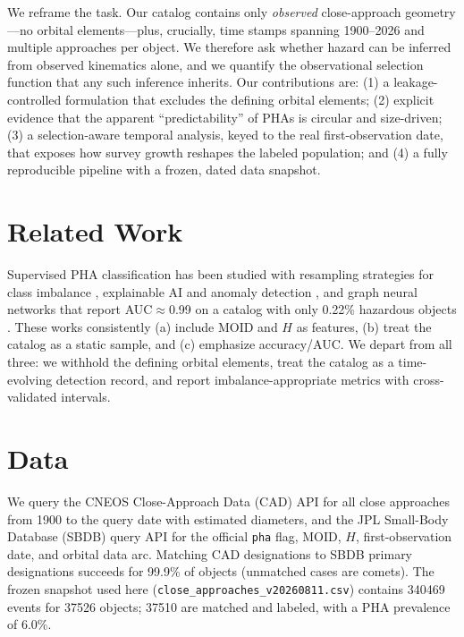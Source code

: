 \documentclass[11pt]{article}
\begin{document}
We reframe the task. Our catalog contains only \emph{observed} close-approach
geometry---no orbital elements---plus, crucially, time stamps spanning 1900--2026 and
multiple approaches per object. We therefore ask whether hazard can be inferred from
observed kinematics alone, and we quantify the observational selection function that
any such inference inherits. Our contributions are: (1) a leakage-controlled
formulation that excludes the defining orbital elements; (2) explicit evidence that
the apparent ``predictability'' of PHAs is circular and size-driven; (3) a
selection-aware temporal analysis, keyed to the real first-observation date, that
exposes how survey growth reshapes the labeled population; and (4) a fully
reproducible pipeline with a frozen, dated data snapshot.

\section{Related Work}
Supervised PHA classification has been studied with resampling strategies for class
imbalance \citep{neo_resampling2025}, explainable AI and anomaly detection
\citep{neo_xai2025}, and graph neural networks that report AUC$\approx$0.99 on a
catalog with only 0.22\% hazardous objects \citep{neo_gnn2025}. These works
consistently (a) include MOID and $H$ as features, (b) treat the catalog as a static
sample, and (c) emphasize accuracy/AUC. We depart from all three: we withhold the
defining orbital elements, treat the catalog as a time-evolving detection record, and
report imbalance-appropriate metrics with cross-validated intervals.

\section{Data}
We query the CNEOS Close-Approach Data (CAD) API \citep{cneos_cad} for all close
approaches from 1900 to the query date with estimated diameters, and the JPL
Small-Body Database (SBDB) query API \citep{jpl_sbdb} for the official \texttt{pha}
flag, MOID, $H$, first-observation date, and orbital data arc. Matching CAD
designations to SBDB primary designations succeeds for 99.9\% of objects (unmatched
cases are comets). The frozen snapshot used here
(\texttt{close\_approaches\_v20260811.csv}) contains \num{340469} events for
\num{37526} objects; \num{37510} are matched and labeled, with a PHA prevalence of
6.0\%.
\end{document}
